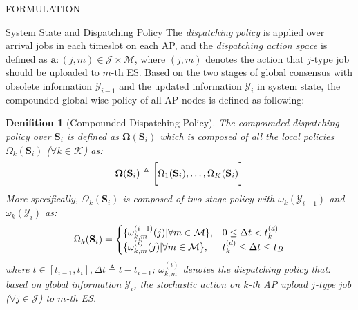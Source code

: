 \documentclass[10pt, conference, letterpaper]{IEEEtran}
\newtheorem{definition}{Denifition}
\newcommand{\define}{\triangleq}
\renewcommand{\vec}{\mathbf}
\DeclarePairedDelimiter{\set}{\{}{\}}
\DeclarePairedDelimiter{\Bracket}{\bigg[}{\bigg]}
\newcommand{\apSet}{\mathcal{K}}
\newcommand{\esSet}{\mathcal{M}}
\newcommand{\jSpace}{\mathcal{J}}
\newcommand{\Stat}{\mathbf{S}}
\newcommand{\Obsv}{\mathcal{Y}}
\newcommand{\Policy}{\mathbf{\Omega}}
\begin{document}
\begin{section}{FORMULATION}
\begin{subsection}{System State and Dispatching Policy}
            The \emph{dispatching policy} is applied over arrival jobs in each timeslot on each AP, and the \emph{dispatching action space} is defined as $\vec{a}: (j, m) \in \jSpace \times \esSet$, where $(j, m)$ denotes the action that $j$-type job should be uploaded to $m$-th ES. Based on the two stages of global consensus with obsolete information $\Obsv_{i-1}$ and the updated information $\Obsv_{i}$ in system state, the compounded global-wise policy of all AP nodes is defined as following:
            \begin{definition}[Compounded Dispatching Policy]
                The compounded dispatching policy over $\Stat_{i}$ is defined as $\Policy(\Stat_{i})$ which is composed of all the local policies $\Omega_k(\Stat_{i})$ ($\forall k\in\apSet$) as:
                \begin{align}
                    \vec{\Omega}(\Stat_{i}) \define \Bracket{\Omega_1(\Stat_{i}), \dots, \Omega_K(\Stat_{i})}
                \end{align}
                More specifically, $\Omega_k(\Stat_{i})$ is composed of two-stage policy with $\omega_k(\Obsv_{i-1})$ and $\omega_k(\Obsv_{i})$ as:
                \begin{align}
                    \Omega_k(\Stat_i) = 
                    \begin{cases}
                        \set{\omega^{(i-1)}_{k,m}(j)|\forall m\in\esSet}, & 0 \leq \Delta{t} < t^{(d)}_k
                        \\
                        \set{\omega^{(i)}_{k,m}(j)|\forall m\in\esSet}, & t^{(d)}_k \leq \Delta{t} \leq t_B
                    \end{cases}
                \end{align}
                where $t\in[t_{i-1}, t_{i}], \Delta{t} \define t - t_{i-1}$; $\omega^{(i)}_{k,m}$ denotes the dispatching policy that: based on global information $\Obsv_{i}$, the stochastic action on $k$-th AP upload $j$-type job ($\forall j\in\jSpace$) to $m$-th ES.
            \end{definition}
        \end{subsection}


\end{section}
\end{document}
